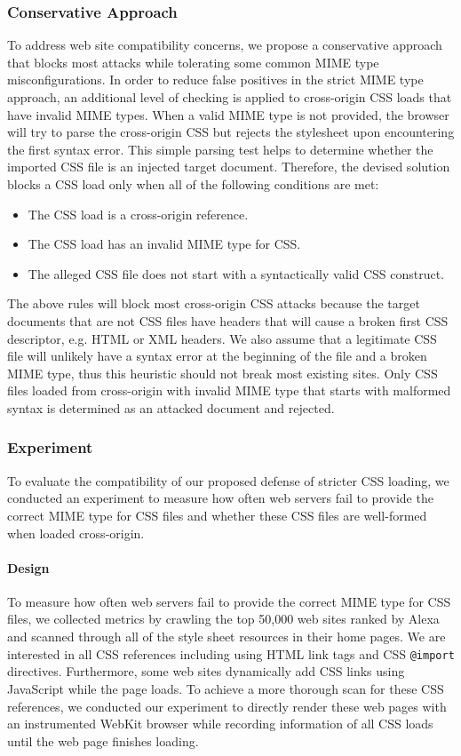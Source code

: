 \documentclass{acm_proc_article-sp}
\begin{document}
\subsubsection{Conservative Approach}
To address web site compatibility concerns, we propose a conservative approach that blocks most attacks while tolerating some common MIME type misconfigurations. In order to reduce false positives in the strict MIME type approach, an additional level of checking is applied to cross-origin CSS loads that have invalid MIME types. When a valid MIME type is not provided, the browser will try to parse the cross-origin CSS but rejects the stylesheet upon encountering the first syntax error. This simple parsing test helps to determine whether the imported CSS file is an injected target document. Therefore, the devised solution blocks a CSS load only when all of the following conditions are met:
\begin{itemize}
\item{The CSS load is a cross-origin reference.}
\item{The CSS load has an invalid MIME type for CSS.}
\item{The alleged CSS file does not start with a syntactically valid CSS construct.}
\end{itemize}
The above rules will block most cross-origin CSS attacks because the target documents that are not CSS files have headers that will cause a broken first CSS descriptor, e.g. HTML or XML headers. We also assume that a legitimate CSS file will unlikely have a syntax error at the beginning of the file and a broken MIME type, thus this heuristic should not break most existing sites. Only CSS files loaded from cross-origin with invalid MIME type that starts with malformed syntax is determined as an attacked document and rejected.

\subsubsection{Experiment}
To evaluate the compatibility of our proposed defense of stricter CSS loading, we conducted an experiment to measure how often web servers fail to provide the correct MIME type for CSS files and whether these CSS files are well-formed when loaded cross-origin.

\paragraph{Design}
To measure how often web servers fail to provide the correct MIME type for CSS files, we collected metrics by crawling the top 50,000 web sites ranked by Alexa~\cite{alexa} and scanned through all of the style sheet resources in their home pages. We are interested in all CSS references including using HTML link tags and CSS \texttt{@import} directives. Furthermore, some web sites dynamically add CSS links using JavaScript while the page loads. To achieve a more thorough scan for these CSS references, we conducted our experiment to directly render these web pages with an instrumented WebKit browser while recording information of all CSS loads until the web page finishes loading.
\end{document}
